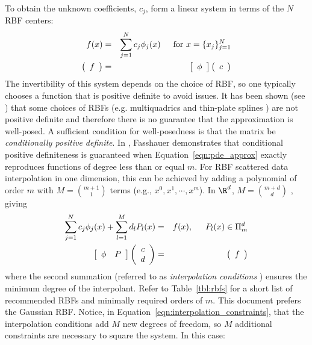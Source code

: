 \documentclass[11pt]{report}
\begin{document}
{To obtain the unknown coefficients, $c_j$, form a linear system in terms of the $N$ RBF centers:
\begin{eqnarray*}
f(x) & = & \sum_{j=1}^{N} c_{j}  \phi_j(x)  \hskip1.5em \textrm{for\ } x = \{x_j\}_{j = 1}^{N} \\
 \parray{c}{ f } & =&  \barray{c}{\phi}\parray{c}{ c } 
\end{eqnarray*}
The invertibility of this system depends on the choice of RBF, so one typically chooses a function that is positive definite to avoid issues. It has been shown (see \cite{Fasshauer2007, Iske2004}) that some choices of RBFs (e.g. multiquadrics and thin-plate splines \cite{Hon2001}) are not positive definite and therefore there is no guarantee that the approximation is well-posed. A sufficient condition for well-posedness is that the matrix be \emph{conditionally positive definite}. In \cite{Fasshauer2007}, Fasshauer demonstrates that conditional positive definiteness is guaranteed when Equation~\ref{eqn:pde_approx} exactly reproduces functions of degree less than or equal $m$. 
For RBF scattered data interpolation in one dimension, this can be achieved by adding a polynomial of order $m$ with $M =$${m+1}\choose{1}$ terms (e.g., $x^0, x^1, \cdots, x^{m}$). 
In $\R^d$, $M =$${m+d}\choose{d}$ \cite{Iske2004}, giving
\begin{eqnarray}
\sum_{j=1}^{N} c_{j}  \phi_j(x)  +  \sum_{l=1}^{M} d_{l} P_l(x) & = & f(x),  \hskip1.5em  P_l(x) \in \Pi^{d}_{m} \label{eqn:interpolation_constraints} \\
\left[ \begin{array}{c c} 
	\phi & P
	\end{array} \right] \left( \begin{array}{c}
							c \\
							d
							 \end{array}
						 \right) & = & \parray{c}{ f } \nonumber
\end{eqnarray}
where the second summation (referred to as \emph{interpolation conditions} \cite{Iske2004}) ensures the minimum degree of the interpolant. Refer to Table~\ref{tbl:rbfs} for a short list of recommended RBFs and minimally required orders of $m$. This document prefers the Gaussian RBF. Notice, in Equation~\ref{eqn:interpolation_constraints}, that the interpolation conditions add $M$ new degrees of freedom, so $M$ 
additional constraints are necessary to square the system. In this case:
}
\end{document}
